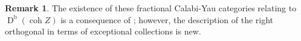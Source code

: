\documentclass[reqno, 12pt]{amsart}
\newtheorem{theorem}{Theorem}[section]
\theoremstyle{definition}
\newtheorem{remark}[theorem]{Remark}
\newcommand{\op}[1]{\operatorname{#1}}
\newcommand{\dbcoh}[1]{\operatorname{D}^{\operatorname{b}}(\operatorname{coh }#1)}
\def\Z{\op{\mathbb{Z}}}
\def\R{\op{\mathbb{R}}}
\def\Q{\op{\mathbb{Q}}}
\def\O{\op{\mathcal{O}}}
\numberwithin{equation}{section}
\begin{document}
\begin{remark}
  The existence of these fractional Calabi-Yau categories relating to $\dbcoh{Z}$ is a consequence of \cite[Corollary 5.12]{FK18}; however, the description of the right orthogonal in terms of exceptional collections is new. 
\end{remark}


\end{document}
